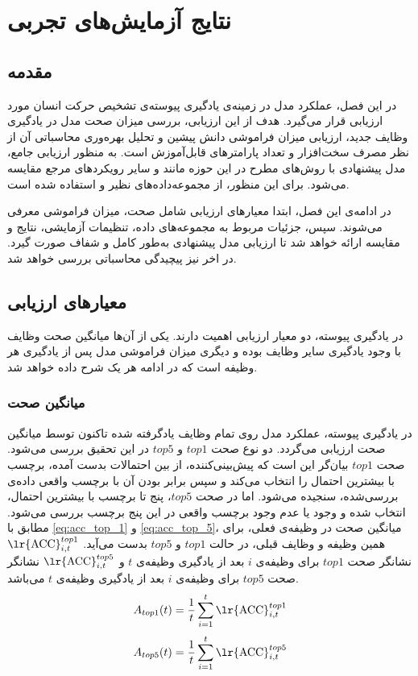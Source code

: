 \chapter{نتایج آزمایش‌های تجربی}
\label{chap4:results}
\section{مقدمه}
در این فصل، عملکرد مدل  در زمینه‌ی یادگیری پیوسته‌ی تشخیص حرکت انسان مورد ارزیابی قرار می‌گیرد. هدف از این ارزیابی، بررسی میزان صحت مدل در یادگیری وظایف جدید، ارزیابی میزان فراموشی دانش پیشین و تحلیل بهره‌وری محاسباتی آن از نظر مصرف سخت‌افزار و تعداد پارامترهای قابل‌آموزش است. به منظور ارزیابی جامع، مدل پیشنهادی با روش‌های مطرح در این حوزه مانند  \cite{pivot}و سایر رویکردهای مرجع مقایسه می‌شود. برای این منظور، از مجموعه‌داده‌های نظیر  \cite{ucf101} و  \cite{hmdb51} استفاده شده است.

در ادامه‌ی‌ این فصل، ابتدا معیارهای ارزیابی شامل صحت، میزان فراموشی معرفی می‌شوند. سپس، جزئیات مربوط به مجموعه‌های داده، تنظیمات آزمایشی، نتایج و مقایسه ارائه خواهد شد تا ارزیابی مدل پیشنهادی به‌طور کامل و شفاف صورت گیرد. در اخر نیز پیچیدگی محاسباتی بررسی خواهد شد. 

\section{معیار‌های ارزیابی}
در یادگیری پیوسته، دو معیار ارزیابی اهمیت دارند. یکی از آن‌ها میانگین صحت وظایف با وجود یادگیری سایر وظایف بوده و دیگری میزان فراموشی مدل پس از یادگیری هر وظیفه است که در ادامه هر یک شرح داده خواهد شد. 
 

\subsection{میانگین صحت}
در یادگیری پیوسته، عملکرد مدل روی تمام وظایف یادگرفته شده تاکنون توسط میانگین صحت ارزیابی می‌گردد. دو نوع صحت $top1$ و $top5$ در این تحقیق بررسی می‌شود. صحت $top1$ بیان‌گر این است که پیش‌بینی‌کننده، از بین احتمالات بدست آمده، برچسب با بیشترین احتمال را انتخاب می‌کند و سپس برابر بودن آن با برچسب واقعی داده‌ی بررسی‌شده، سنجیده می‌‌شود. اما در صحت $top5$، پنج تا برچسب با بیشترین احتمال، انتخاب شده و وجود یا عدم وجود برچسب واقعی در این پنج برچسب بررسی می‌شود. مطابق با \eqref{eq:acc_top_1} و \eqref{eq:acc_top_5}، میانگین صحت در وظیفه‌ی فعلی، برای همین وظیفه و وظایف قبلی، در حالت $top1$ و $top5$ بدست می‌آید. $\text{\lr{ACC}}^{top1}_{i,t}$ نشانگر صحت $top1$ برای وظیفه‌ی $i$ بعد از یادگیری وظیفه‌ی $t$ و $\text{\lr{ACC}}^{top5}_{i,t}$ نشانگر صحت $top5$ برای وظیفه‌ی $i$ بعد از یادگیری وظیفه‌ی $t$ می‌باشد.
\begin{equation}\label{eq:acc_top_1}
	A_{top1}(t) = \frac{1}{t} \sum_{i=1}^{t} \text{\lr{ACC}}^{top1}_{i,t}
\end{equation}
\begin{equation}\label{eq:acc_top_5}
	A_{top5}(t) = \frac{1}{t} \sum_{i=1}^{t} \text{\lr{ACC}}^{top5}_{i,t}
\end{equation}


